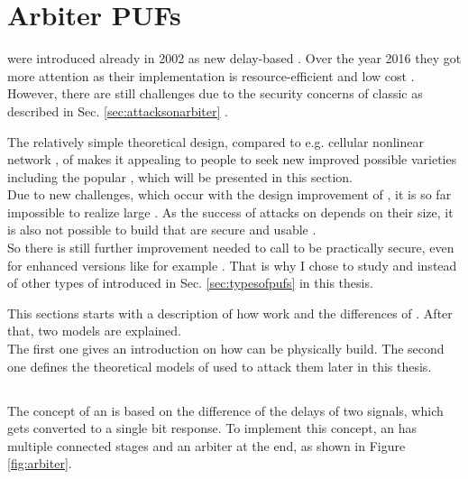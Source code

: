 \chapter{Arbiter \acsp{PUF}}
\label{cap:arbiter}

\apufs were introduced already in 2002 as new delay-based \puf \cite{Gassend2002SiliconFunctions}.
Over the year 2016 they got more attention as their implementation is resource-efficient and low cost \cite{Becker2014ActiveDesigns,Suh2007PhysicalGeneration}.
However, there are still challenges due to the security concerns of classic \apufs as described in Sec. \ref{sec:attacksonarbiter} \cite{Ganji2016PACPUFs, Ruhrmair2014PUFOverview}.

The relatively simple theoretical design, compared to e.g. cellular nonlinear network \pufs, of \apufs makes it appealing to people to seek new improved possible varieties including the popular \xpuf, which will be presented in this section.\\
Due to new challenges, which occur with the design improvement of \xpufs, it is so far impossible to realize large \xpufs \cite{Rostami2014RobustMatching}.
As the success of attacks on \xpufs depends on their size, it is also not possible to build \xpufs that are secure and usable \cite{Ganji2015WhyPUFs}.\\
So there is still further improvement needed to call \apufs to be practically secure, even for enhanced versions like for example \xpufs.
That is why I chose to study \apufs and \xpufs instead of other types of \pufs introduced in Sec. \ref{sec:typesofpufs} in this thesis.

This sections starts with a description of how \apufs work and the differences of \xpufs.
After that, two models are explained.\\
The first one gives an introduction on how \apufs can be physically build.
The second one defines the theoretical models of \apufs used to attack them later in this thesis.

\section{\apufs}
\label{sec:arbiter}

The concept of an \apufs is based on the difference of the delays of two signals, which gets converted to a single bit response. 
To implement this concept, an \apuf has multiple connected stages and an arbiter at the end, as shown in Figure \ref{fig:arbiter}.

